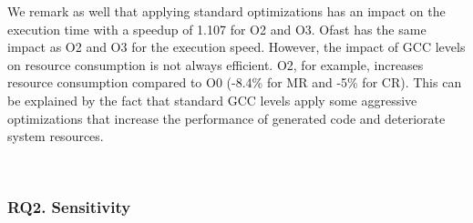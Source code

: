 We remark as well that applying standard optimizations has an impact on the execution time with a speedup of 1.107 for O2 and O3. Ofast has the same impact as O2 and O3 for the execution speed. However, the impact of GCC levels on resource consumption is not always efficient. O2, for example, increases resource consumption compared to O0 (-8.4\% for MR and -5\% for CR). This can be explained by the fact that standard GCC levels apply some aggressive optimizations that increase the performance of generated code and deteriorate system resources.  




\noindent{}
\\
\subsubsection{RQ2. Sensitivity}
